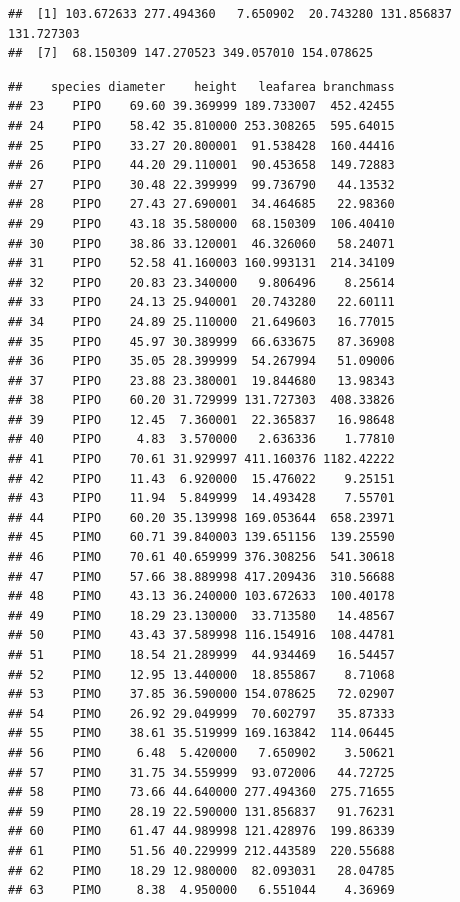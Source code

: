 \documentclass[]{book}
\newenvironment{Shaded}{\begin{snugshade}}{\end{snugshade}}
\newcommand{\CommentTok}[1]{\textcolor[rgb]{0.56,0.35,0.01}{\textit{#1}}}
\newcommand{\KeywordTok}[1]{\textcolor[rgb]{0.13,0.29,0.53}{\textbf{#1}}}
\newcommand{\NormalTok}[1]{#1}
\newcommand{\OperatorTok}[1]{\textcolor[rgb]{0.81,0.36,0.00}{\textbf{#1}}}
\newcommand{\StringTok}[1]{\textcolor[rgb]{0.31,0.60,0.02}{#1}}
\begin{document}
\begin{verbatim}
##  [1] 103.672633 277.494360   7.650902  20.743280 131.856837 131.727303
##  [7]  68.150309 147.270523 349.057010 154.078625
\end{verbatim}

\begin{Shaded}
\end{Shaded}

\begin{verbatim}
##    species diameter    height   leafarea branchmass
## 23    PIPO    69.60 39.369999 189.733007  452.42455
## 24    PIPO    58.42 35.810000 253.308265  595.64015
## 25    PIPO    33.27 20.800001  91.538428  160.44416
## 26    PIPO    44.20 29.110001  90.453658  149.72883
## 27    PIPO    30.48 22.399999  99.736790   44.13532
## 28    PIPO    27.43 27.690001  34.464685   22.98360
## 29    PIPO    43.18 35.580000  68.150309  106.40410
## 30    PIPO    38.86 33.120001  46.326060   58.24071
## 31    PIPO    52.58 41.160003 160.993131  214.34109
## 32    PIPO    20.83 23.340000   9.806496    8.25614
## 33    PIPO    24.13 25.940001  20.743280   22.60111
## 34    PIPO    24.89 25.110000  21.649603   16.77015
## 35    PIPO    45.97 30.389999  66.633675   87.36908
## 36    PIPO    35.05 28.399999  54.267994   51.09006
## 37    PIPO    23.88 23.380001  19.844680   13.98343
## 38    PIPO    60.20 31.729999 131.727303  408.33826
## 39    PIPO    12.45  7.360001  22.365837   16.98648
## 40    PIPO     4.83  3.570000   2.636336    1.77810
## 41    PIPO    70.61 31.929997 411.160376 1182.42222
## 42    PIPO    11.43  6.920000  15.476022    9.25151
## 43    PIPO    11.94  5.849999  14.493428    7.55701
## 44    PIPO    60.20 35.139998 169.053644  658.23971
## 45    PIMO    60.71 39.840003 139.651156  139.25590
## 46    PIMO    70.61 40.659999 376.308256  541.30618
## 47    PIMO    57.66 38.889998 417.209436  310.56688
## 48    PIMO    43.13 36.240000 103.672633  100.40178
## 49    PIMO    18.29 23.130000  33.713580   14.48567
## 50    PIMO    43.43 37.589998 116.154916  108.44781
## 51    PIMO    18.54 21.289999  44.934469   16.54457
## 52    PIMO    12.95 13.440000  18.855867    8.71068
## 53    PIMO    37.85 36.590000 154.078625   72.02907
## 54    PIMO    26.92 29.049999  70.602797   35.87333
## 55    PIMO    38.61 35.519999 169.163842  114.06445
## 56    PIMO     6.48  5.420000   7.650902    3.50621
## 57    PIMO    31.75 34.559999  93.072006   44.72725
## 58    PIMO    73.66 44.640000 277.494360  275.71655
## 59    PIMO    28.19 22.590000 131.856837   91.76231
## 60    PIMO    61.47 44.989998 121.428976  199.86339
## 61    PIMO    51.56 40.229999 212.443589  220.55688
## 62    PIMO    18.29 12.980000  82.093031   28.04785
## 63    PIMO     8.38  4.950000   6.551044    4.36969
\end{verbatim}
\end{document}
